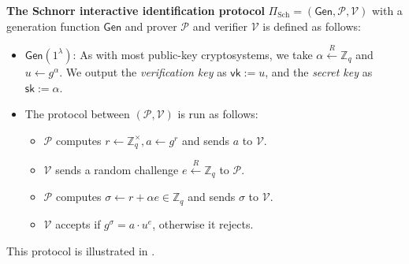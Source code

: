 \documentclass[../lecture-notes.tex]{subfiles}
\begin{document}
\begin{definition}
    \textbf{The Schnorr interactive identification protocol} $\Pi_{\text{Sch}} = (\mathsf{Gen}, \mathcal{P}, \mathcal{V})$ with a generation function $\mathsf{Gen}$ and prover $\mathcal{P}$ and verifier $\mathcal{V}$ is defined as follows:
    \begin{itemize}
        \item $\mathsf{Gen}(1^{\lambda})$: As with most public-key cryptosystems, we take $\alpha \xleftarrow{R} \mathbb{Z}_q$ and $u \gets g^{\alpha}$. We output the \textit{verification key} as $\mathsf{vk} := u$, and the \textit{secret key} as $\mathsf{sk} := \alpha$.
        \item The protocol between $(\mathcal{P},\mathcal{V})$ is run as follows:
        \begin{itemize}
            \item $\mathcal{P}$ computes $r \gets \mathbb{Z}_q^{\times}, a \gets g^{r}$ and sends $a$ to $\mathcal{V}$.
            \item $\mathcal{V}$ sends a random challenge $e \xleftarrow{R} \mathbb{Z}_q$ to $\mathcal{P}$.
            \item $\mathcal{P}$ computes $\sigma \gets r + \alpha e \in \mathbb{Z}_q$ and sends $\sigma$ to $\mathcal{V}$.
            \item $\mathcal{V}$ accepts if $g^{\sigma} = a \cdot u^e$, otherwise it rejects.
        \end{itemize}
    \end{itemize}

    This protocol is illustrated in . 
\end{definition}
\end{document}
